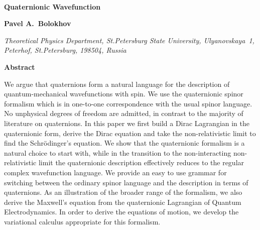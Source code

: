 \documentclass[epsfig,12pt]{article}
\begin{document}
\begin{titlepage}
\ \ 
\vskip 2cm
\begin{center}
{  \Large \bf  Quaternionic Wavefunction }
\end{center}
\vskip 0.5cm

\begin{center}

 {\large
 \bf   Pavel A.~Bolokhov
 }
\end {center}

\begin{center}
{\it Theoretical Physics Department, St.Petersburg State University, Ulyanovskaya~1, 
	Peterhof, St.Petersburg, 198504, Russia}
\end{center}




\begin{center}
{\large\bf Abstract}
\end{center}

\hspace{0.3cm}
	We argue that quaternions form a natural language for the description of
	quantum-mechanical wavefunctions with spin.
	We use the quaternionic spinor formalism which is in one-to-one correspondence with the usual
	spinor language.
	No unphysical degrees of freedom are admitted, in contrast to the majority of literature on quaternions.
	In this paper we first build a Dirac Lagrangian in the quaternionic form,
	derive the Dirac equation and take the non-relativistic limit to find the Schr\"odinger's equation.
	We show that the quaternionic formalism is a natural choice to start with,
	while in the transition to the non-interacting non-relativistic limit the quaternionic description 
	effectively reduces to the regular complex wavefunction language.
	We provide an easy to use grammar for switching between the ordinary spinor language
	and the description in terms of quaternions.
	As an illustration of the broader range of the formalism,
	we also derive the Maxwell's equation from the quaternionic Lagrangian of Quantum Electrodynamics.
	In order to derive the equations of motion, we develop the variational calculus
	appropriate for this formalism.
\vspace{2cm}


\end{titlepage}
\end{document}
